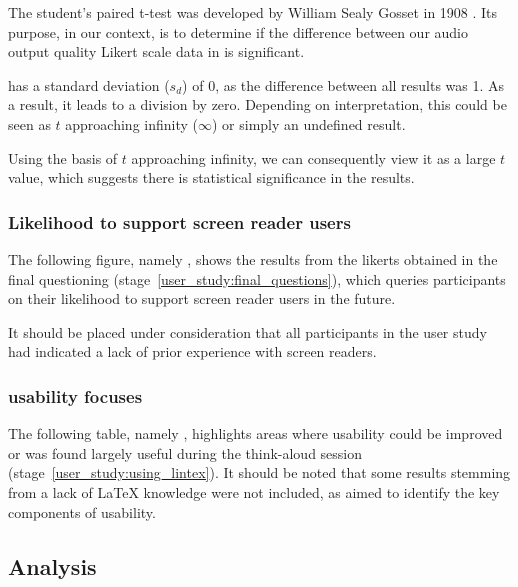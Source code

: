 The student's paired t-test was developed by William Sealy Gosset in 1908 \parencite{t-test}. Its purpose, in our context, is to determine if the difference between our audio output quality Likert scale data in  is significant.



 has a standard deviation ($s_d$) of 0, as the difference between all results was 1. As a result, it leads to a division by zero. Depending on interpretation, this could be seen as $t$ approaching infinity ($\infty$) or simply an undefined result.

Using the basis of $t$ approaching infinity, we can consequently view it as a large $t$ value, which suggests there is statistical significance in the results.

\subsubsection{Likelihood to support screen reader users}

The following figure, namely , shows the results from the \glspl{likert} obtained in the final questioning (stage~\ref{user_study:final_questions}), which queries participants on their likelihood to support screen reader users in the future.



It should be placed under consideration that all participants in the user study had indicated a lack of prior experience with screen readers.

\subsubsection{\lintexspaced usability focuses}

The following table, namely , highlights areas where usability could be improved or was found largely useful during the think-aloud session (stage~\ref{user_study:using_lintex}). It should be noted that some results stemming from a lack of LaTeX knowledge were not included, as  aimed to identify the key components of usability.



\subsection{Analysis}
